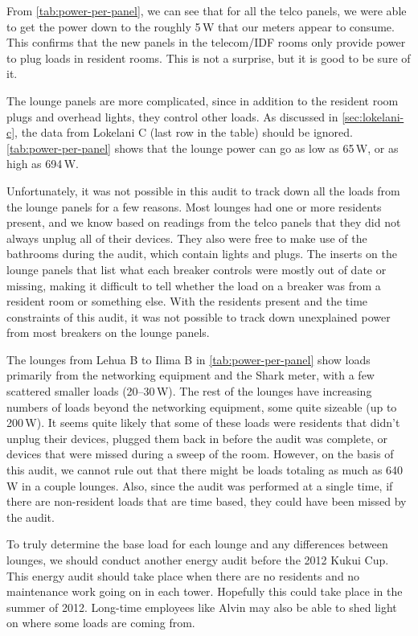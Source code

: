 \documentclass[11pt,draft]{article}
\newcommand{\W}{\,W\xspace}
\begin{document}
From \autoref{tab:power-per-panel}, we can see that for all the telco panels, we were able to get the power down to the roughly 5\W that our meters appear to consume. This confirms that the new panels in the telecom/IDF rooms only provide power to plug loads in resident rooms. This is not a surprise, but it is good to be sure of it.

The lounge panels are more complicated, since in addition to the resident room plugs and overhead lights, they control other loads. As discussed in \autoref{sec:lokelani-c}, the data from Lokelani C (last row in the table) should be ignored. \autoref{tab:power-per-panel} shows that the lounge power can go as low as 65\W, or as high as 694\W.

Unfortunately, it was not possible in this audit to track down all the loads from the lounge panels for a few reasons. Most lounges had one or more residents present, and we know based on readings from the telco panels that they did not always unplug all of their devices. They also were free to make use of the bathrooms during the audit, which contain lights and plugs. The inserts on the lounge panels that list what each breaker controls were mostly out of date or missing, making it difficult to tell whether the load on a breaker was from a resident room or something else. With the residents present and the time constraints of this audit, it was not possible to track down unexplained power from most breakers on the lounge panels.

The lounges from Lehua B to Ilima B in \autoref{tab:power-per-panel} show loads primarily from the networking equipment and the Shark meter, with a few scattered smaller loads (20--30\W). The rest of the lounges have increasing numbers of loads beyond the networking equipment, some quite sizeable (up to 200\W). It seems quite likely that some of these loads were residents that didn't unplug their devices, plugged them back in before the audit was complete, or devices that were missed during a sweep of the room. However, on the basis of this audit, we cannot rule out that there might be loads totaling as much as 640\W in a couple lounges. Also, since the audit was performed at a single time, if there are non-resident loads that are time based, they could have been missed by the audit.

To truly determine the base load for each lounge and any differences between lounges, we should conduct another energy audit before the 2012 Kukui Cup. This energy audit should take place when there are no residents and no maintenance work going on in each tower. Hopefully this could take place in the summer of 2012. Long-time employees like Alvin may also be able to shed light on where some loads are coming from.
\end{document}
